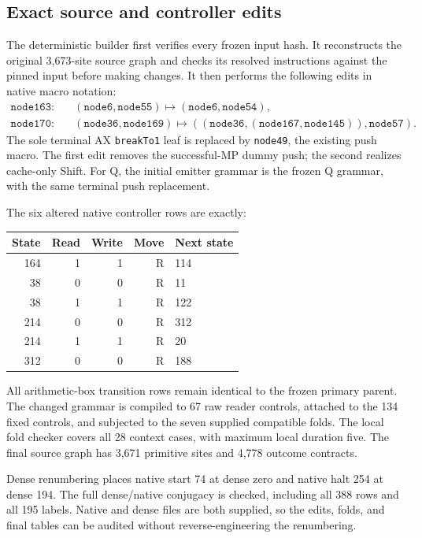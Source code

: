 \documentclass[11pt,a4paper]{article}
\begin{document}
\subsection{Exact source and controller edits}

The deterministic builder first verifies every frozen input hash. It
reconstructs the original 3,673-site source graph and checks its resolved
instructions against the pinned input before making changes. It then
performs the following edits in native macro notation:
\begin{align*}
 \texttt{node163}:&\quad(\texttt{node6},\texttt{node55})
                    \longmapsto(\texttt{node6},\texttt{node54}),\\
 \texttt{node170}:&\quad(\texttt{node36},\texttt{node169})
                    \longmapsto
 ((\texttt{node36},(\texttt{node167},\texttt{node145})),\texttt{node57}).
\end{align*}
The sole terminal AX \texttt{breakTo1} leaf is replaced by
\texttt{node49}, the existing push macro. The first edit removes the
successful-MP dummy push; the second realizes cache-only Shift. For Q,
the initial emitter grammar is the frozen Q grammar, with the same
terminal push replacement.

The six altered native controller rows are exactly:
\begin{center}
\begin{tabular}{rrrrl}
\toprule
State & Read & Write & Move & Next state\\
\midrule
164 & 1 & 1 & R & 114\\
38 & 0 & 0 & R & 11\\
38 & 1 & 1 & R & 122\\
214 & 0 & 0 & R & 312\\
214 & 1 & 1 & R & 20\\
312 & 0 & 0 & R & 188\\
\bottomrule
\end{tabular}
\end{center}
All arithmetic-box transition rows remain identical to the frozen
primary parent. The changed grammar is compiled to 67 raw reader
controls, attached to the 134 fixed controls, and subjected to the
seven supplied compatible folds. The local fold checker covers all
28 context cases, with maximum local duration five. The final source
graph has 3,671 primitive sites and 4,778 outcome contracts.



Dense renumbering places native start 74 at dense zero and native
halt 254 at dense 194. The full dense/native conjugacy is checked,
including all 388 rows and all 195 labels. Native and dense files
are both supplied, so the edits, folds, and final tables can be audited
without reverse-engineering the renumbering.
\end{document}
